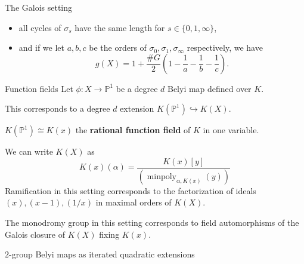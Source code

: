 \documentclass[xcolor=dvipsnames]{beamer}
\theoremstyle{plain}
\newcommand{\PP}{\mathbb P}
\DeclareMathOperator{\minpoly}{minpoly}
\begin{document}
{\begin{frame}{The Galois setting}
\begin{itemize}
          $\#G = d$,
        \item
          all cycles of $\sigma_s$ have the same
          length for $s\in\{0,1,\infty\}$,
        \item
          and if we let $a,b,c$ be the orders
          of $\sigma_0,\sigma_1,\sigma_\infty$
          respectively,
          we have
          \[
            g(X) = 1+\frac{\#G}{2}
            \left(
              1-\frac{1}{a}
              -\frac{1}{b}
              -\frac{1}{c}
            \right).
          \]
      \end{itemize}
    \end{frame}
    \begin{frame}{Function fields}
      Let $\phi\colon X\to\PP^1$ be
      a degree $d$ Belyi map defined over $K$.
      \pause\par
      This corresponds to a degree $d$
      extension
      $K(\PP^1)\hookrightarrow K(X)$.
      \pause\par
      $K(\PP^1)\cong K(x)$
      the
      \textbf{rational function field}
      of $K$ in one variable.
      \pause\par
      We can write $K(X)$ as
      \[
        K(x)(\alpha) = \frac{K(x)[y]}{(\minpoly_{\alpha,K(x)}(y))}
      \]
      \pause
      Ramification in this setting corresponds
      to the factorization of ideals
      $(x),(x-1),(1/x)$
      in maximal orders of $K(X)$.
      \pause\par
      The monodromy group in this setting
      corresponds to field automorphisms
      of the Galois closure of $K(X)$
      fixing $K(x)$.
    \end{frame}
    \begin{frame}[fragile]{$2$-group Belyi maps as iterated quadratic extensions}
      \begin{center}
\end{center}
\end{frame}}
\end{document}
